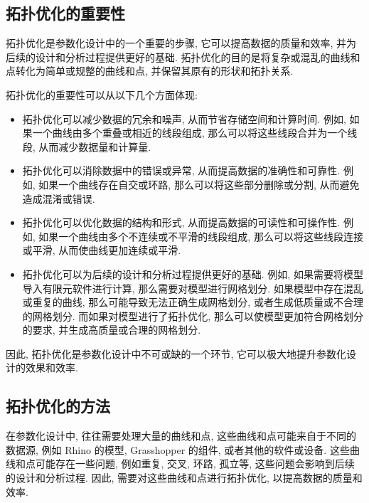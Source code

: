 
\subsection{拓扑优化的重要性}

拓扑优化是参数化设计中的一个重要的步骤, 它可以提高数据的质量和效率, 并为后续的设计和分析过程提供更好的基础. 拓扑优化的目的是将复杂或混乱的曲线和点转化为简单或规整的曲线和点, 并保留其原有的形状和拓扑关系.

拓扑优化的重要性可以从以下几个方面体现:
\begin{itemize}
  \item 拓扑优化可以减少数据的冗余和噪声, 从而节省存储空间和计算时间. 例如, 如果一个曲线由多个重叠或相近的线段组成, 那么可以将这些线段合并为一个线段, 从而减少数据量和计算量.
  \item 拓扑优化可以消除数据中的错误或异常, 从而提高数据的准确性和可靠性. 例如, 如果一个曲线存在自交或环路, 那么可以将这些部分删除或分割, 从而避免造成混淆或错误.
  \item 拓扑优化可以优化数据的结构和形式, 从而提高数据的可读性和可操作性. 例如, 如果一个曲线由多个不连续或不平滑的线段组成, 那么可以将这些线段连接或平滑, 从而使曲线更加连续或平滑.
  \item 拓扑优化可以为后续的设计和分析过程提供更好的基础. 例如, 如果需要将模型导入有限元软件进行计算, 那么需要对模型进行网格划分. 如果模型中存在混乱或重复的曲线, 那么可能导致无法正确生成网格划分, 或者生成低质量或不合理的网格划分. 而如果对模型进行了拓扑优化, 那么可以使模型更加符合网格划分的要求, 并生成高质量或合理的网格划分.
\end{itemize}

因此, 拓扑优化是参数化设计中不可或缺的一个环节, 它可以极大地提升参数化设计的效果和效率.

\subsection{拓扑优化的方法}

在参数化设计中, 往往需要处理大量的曲线和点, 这些曲线和点可能来自于不同的数据源, 例如 Rhino 的模型, Grasshopper 的组件, 或者其他的软件或设备. 这些曲线和点可能存在一些问题, 例如重复, 交叉, 环路, 孤立等, 这些问题会影响到后续的设计和分析过程. 因此, 需要对这些曲线和点进行拓扑优化, 以提高数据的质量和效率.

